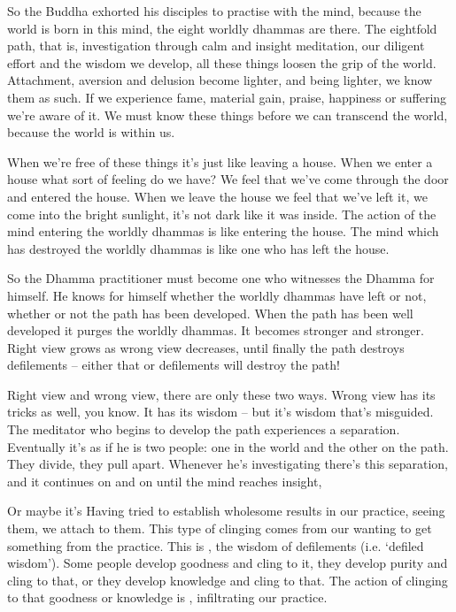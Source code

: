 So the Buddha exhorted his disciples to practise with the mind, because the world is born in this mind, the eight worldly dhammas are there. The eightfold path, that is, investigation through calm and insight meditation, our diligent effort and the wisdom we develop, all these things loosen the grip of the world. Attachment, aversion and delusion become lighter, and being lighter, we know them as such. If we experience fame, material gain, praise, happiness or suffering we're aware of it. We must know these things before we can transcend the world, because the world is within us.

When we're free of these things it's just like leaving a house. When we enter a house what sort of feeling do we have? We feel that we've come through the door and entered the house. When we leave the house we feel that we've left it, we come into the bright sunlight, it's not dark like it was inside. The action of the mind entering the worldly dhammas is like entering the house. The mind which has destroyed the worldly dhammas is like one who has left the house.

So the Dhamma practitioner must become one who witnesses the Dhamma for himself. He knows for himself whether the worldly dhammas have left or not, whether or not the path has been developed. When the path has been well developed it purges the worldly dhammas. It becomes stronger and stronger. Right view grows as wrong view decreases, until finally the path destroys defilements -- either that or defilements will destroy the path!

Right view and wrong view, there are only these two ways. Wrong view has its tricks as well, you know. It has its wisdom -- but it's wisdom that's misguided. The meditator who begins to develop the path experiences a separation. Eventually it's as if he is two people: one in the world and the other on the path. They divide, they pull apart. Whenever he's investigating there's this separation, and it continues on and on until the mind reaches insight, 

Or maybe it's  Having tried to establish wholesome results in our practice, seeing them, we attach to them. This type of clinging comes from our wanting to get something from the practice. This is , the wisdom of defilements (i.e. `defiled wisdom'). Some people develop goodness and cling to it, they develop purity and cling to that, or they develop knowledge and cling to that. The action of clinging to that goodness or knowledge is , infiltrating our practice.

